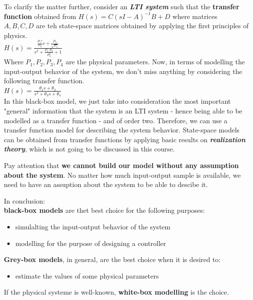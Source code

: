 To clarify the matter further, consider an \textbf{\textit{LTI system}} such that the \textbf{transfer function} obtained from \(H(s) = C (sI - A)^{-1}B +D\) where matrices \(A, B, C, D\) are teh state-space matrices obtained by applying the first principles of physics.\\

\(
H(s) = \frac{ \frac{P_1²}{P_2} s + \frac{P_3}{\sqrt{P_4}}}{s^2 + \frac{P_1.P_2}{P_3^3} + 1}
\)\\

Where \(P_1, P_2, P_3, P_4\) are the physical parameters. Now, in terms of modelling the input-output behavior of the system, we don't miss anything by considering the following transfer function.\\

\(
H(s) = \frac{\theta_1 s + \theta_2}{s^2 + \theta_3 s + \theta_4}
\)\\

In this black-box model, we just take into consideration the most important "general" information that the system is an LTI system - hence being able to be modelled as a transfer function - and of order two. Therefore, we can use a transfer function model for describing the system behavior. State-space models can be obtained from transfer functions by applying basic results on \textbf{\textit{realization theory}}, which is not going to be discussed in this course.\\

\begin{factbox}
    Pay attention that \textbf{we cannot build our model without any assumption about the system}. No matter how much input-output sample is available,  we need to have an assuption about the system to be able to descibe it.
\end{factbox}

In conclusion: \\
\textbf{black-box models} are thet best choice for the following purposes:
\begin{itemize}
    \item simulalting the input-output behavior of the system
    \item modelling for the purpose of designing a controller\\
\end{itemize}

\textbf{Grey-box models}, in general, are the best choice when it is desired to:
\begin{itemize}
    \item estimate the values of some physical parameters \\
\end{itemize}

If the physical systeme is well-known, \textbf{white-box modelling} is the choice.
